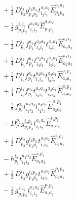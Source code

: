 \documentclass[11pt]{article}
\begin{document}
\begin{align}
&\quad + \tfrac{1}{2}\, D^{i_{1}}_{p_{3}} g^{i_{2}p_{3}}_{p_{1}p_{2}} t^{a_{1}a_{2}}_{i_{2}i_{1}} \hat{E}^{a_{1}a_{2}}_{p_{1}p_{2}} \\
&\quad - \tfrac{1}{2}\, g^{i_{1}i_{2}}_{p_{1}p_{2}} t^{a_{1}a_{2}}_{i_{1}i_{2}} \hat{E}^{a_{1}a_{2}}_{p_{1}p_{2}} \\
&\quad - \tfrac{1}{2}\, D^{i_{2}}_{p_{1}} f^{a_{4}}_{p_{1}} t^{a_{2}a_{3}}_{i_{3}i_{1}} t^{a_{4}a_{1}}_{i_{2}i_{3}} \hat{E}^{a_{1}i_{1}}_{a_{2}a_{3}} \\
&\quad + \tfrac{1}{4}\, D^{i_{2}}_{p_{1}} f^{a_{4}}_{p_{1}} t^{a_{2}a_{3}}_{i_{3}i_{1}} t^{a_{4}a_{1}}_{i_{3}i_{2}} \hat{E}^{a_{1}i_{1}}_{a_{2}a_{3}} \\
&\quad + \tfrac{1}{4}\, D^{i_{1}}_{i_{2}} f^{a_{4}}_{p_{1}} t^{a_{2}a_{3}}_{i_{1}i_{3}} t^{a_{4}a_{1}}_{i_{3}i_{2}} \hat{E}^{a_{1}p_{1}}_{a_{2}a_{3}} \\
&\quad + \tfrac{1}{4}\, D^{i_{1}}_{i_{2}} f^{a_{4}}_{p_{1}} t^{a_{2}a_{3}}_{i_{3}i_{1}} t^{a_{4}a_{1}}_{i_{2}i_{3}} \hat{E}^{a_{1}p_{1}}_{a_{2}a_{3}} \\
&\quad - \tfrac{1}{2}\, f^{a_{4}}_{p_{1}} t^{a_{2}a_{3}}_{i_{1}i_{2}} t^{a_{4}a_{1}}_{i_{2}i_{1}} \hat{E}^{a_{1}p_{1}}_{a_{2}a_{3}} \\
&\quad - D^{p_{2}}_{p_{3}} g^{i_{2}p_{2}}_{p_{1}p_{3}} t^{a_{1}a_{2}}_{i_{1}i_{2}} \hat{E}^{i_{1}p_{1}}_{a_{1}a_{2}} \\
&\quad + \tfrac{1}{2}\, D^{p_{2}}_{p_{3}} g^{i_{2}p_{2}}_{p_{3}p_{1}} t^{a_{1}a_{2}}_{i_{1}i_{2}} \hat{E}^{i_{1}p_{1}}_{a_{1}a_{2}} \\
&\quad - h^{i_{2}}_{p_{1}} t^{a_{1}a_{2}}_{i_{1}i_{2}} \hat{E}^{i_{1}p_{1}}_{a_{1}a_{2}} \\
&\quad + \tfrac{1}{2}\, D^{i_{1}}_{p_{3}} g^{i_{2}p_{3}}_{p_{1}p_{2}} t^{a_{1}a_{2}}_{i_{2}i_{1}} \hat{E}^{p_{1}p_{2}}_{a_{1}a_{2}} \\
&\quad - \tfrac{1}{2}\, g^{i_{1}i_{2}}_{p_{1}p_{2}} t^{a_{1}a_{2}}_{i_{1}i_{2}} \hat{E}^{p_{1}p_{2}}_{a_{1}a_{2}}
\end{align}
\end{document}
